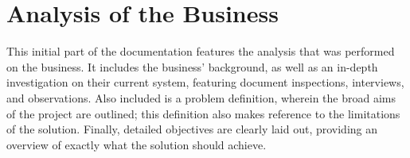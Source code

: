 \part{Analysis of the Business} %
\label{prt:analysis_ _of_ _the_ _business_}
This initial part of the documentation features the analysis that was performed on the business. It includes the business' background, as well as an in-depth investigation on their current system, featuring document inspections, interviews, and observations. Also included is a problem definition, wherein the broad aims of the project are outlined; this definition also makes reference to the limitations of the solution. Finally, detailed objectives are clearly laid out, providing an overview of exactly what the solution should achieve.








